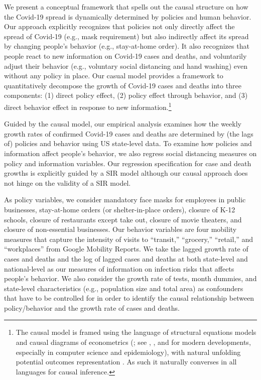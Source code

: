 \documentclass[11pt,reqno,letter]{amsart}
\theoremstyle{definition}
\begin{document}
We present a conceptual framework that spells out the causal structure on how the Covid-19 spread  is dynamically determined by policies and human behavior. Our approach explicitly recognizes that policies not only directly affect the spread of Covid-19 (e.g., mask requirement) but also indirectly affect its spread by changing people's behavior (e.g., stay-at-home order). It also recognizes that people react to new information on Covid-19 cases and deaths, and voluntarily adjust their behavior (e.g., voluntary social distancing and hand washing) even without any policy in place.  Our casual model provides a framework to quantitatively decompose the growth of Covid-19 cases and deaths into three components: (1) direct policy effect, (2) policy effect through behavior, and (3) direct behavior effect in response to new information.\footnote{The causal model is framed using the language of structural equations models and causal diagrams of econometrics (\cite{pwright, haavelmo1944, heckman2007}; see \cite{pearl:robins}, \cite{peters2020book}, and \cite{hernanrobins2020book} for  modern developments, especially in computer science and epidemiology), with natural unfolding potential outcomes representation \citep{rubin1974,tinbergen1930,neyman:PO,imbens_rubin_2015}. As such it naturally converses in all languages for causal inference.}

Guided by the causal model, our empirical analysis examines how the weekly growth rates of confirmed Covid-19 cases and deaths are determined by (the lags of) policies and behavior using US state-level data. To examine how policies and information affect people's behavior, we also regress social distancing measures  on policy and information variables. Our regression specification for case and death growths is explicitly guided by a SIR model although  our causal approach does not hinge on the validity of a SIR model.


As policy variables, we consider  mandatory face masks for employees in public businesses, stay-at-home orders (or shelter-in-place orders), closure of K-12 schools, closure of restaurants except take out, closure of movie theaters, and closure of non-essential businesses. Our behavior variables are four mobility measures that capture the intensity of visits to ``transit,'' ``grocery,'' ``retail,'' and ``workplaces''  from Google Mobility Reports. We take the lagged growth rate of cases and deaths and the log of lagged cases and deaths at both state-level and national-level as our measures of information on infection risks that affects people's  behavior. We also consider the growth rate of tests, month dummies, and state-level characteristics (e.g., population size and total area) as confounders that have to be controlled for in order to identify the causal relationship between policy/behavior and the growth rate of cases and deaths.
\end{document}
